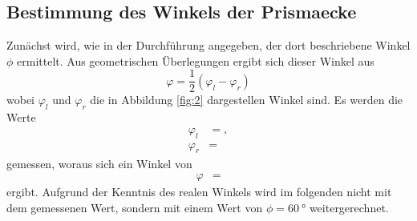 
\subsection{Bestimmung des Winkels der Prismaecke}
Zunächst wird, wie in der Durchführung angegeben, der dort beschriebene Winkel $\phi$ ermittelt.
Aus geometrischen Überlegungen ergibt sich dieser Winkel aus
\begin{equation}
  \varphi = \frac{1}{2} ( \varphi_l - \varphi_r)
\end{equation}
wobei $\varphi_l$ und $\varphi_r$ die in Abbildung \ref{fig:2} dargestellen Winkel sind.
Es werden die Werte
\begin{align*}
  \varphi_l &= ,\\
  \varphi_r &= 
\end{align*}
gemessen, woraus sich ein Winkel von
\begin{align*}
  \varphi &= 
\end{align*}
ergibt.
Aufgrund der Kenntnis des realen Winkels wird im folgenden nicht mit dem gemessenen Wert, sondern mit einem Wert von $\phi = \SI{60}{\degree}$ weitergerechnet.

